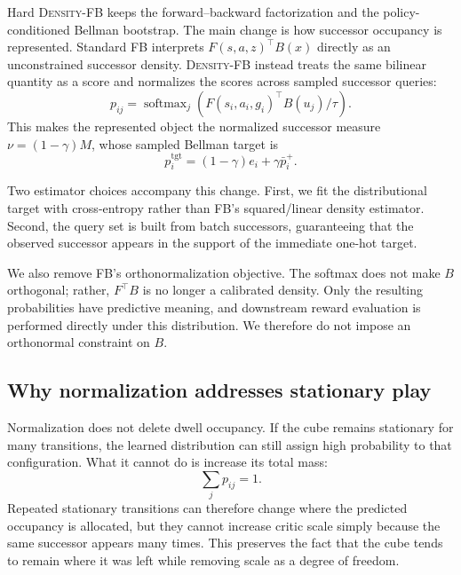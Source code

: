 \documentclass{article}
\newcommand{\DensityFB}{\textsc{Density-FB}}
\begin{document}
Hard \DensityFB{} keeps the forward--backward factorization and the policy-conditioned Bellman bootstrap.
The main change is how successor occupancy is represented.
Standard FB interprets $F(s,a,z)^\top B(x)$ directly as an unconstrained successor density.
\DensityFB{} instead treats the same bilinear quantity as a score and normalizes the scores across sampled successor queries:
\begin{equation}
    p_{ij} = \operatorname{softmax}_j \left( F(s_i,a_i,g_i)^\top B(u_j)/\tau \right).
\end{equation}
This makes the represented object the normalized successor measure $\nu=(1-\gamma)M$, whose sampled Bellman target is 
\begin{equation}
p_i^{\mathrm{tgt}} = (1-\gamma)e_i+\gamma\bar p_i^+.
\end{equation}

Two estimator choices accompany this change.
First, we fit the distributional target with cross-entropy rather than FB's squared/linear density estimator.
Second, the query set is built from batch successors, guaranteeing that the observed successor appears in the support of the immediate one-hot target.

We also remove FB's orthonormalization objective.
The softmax does not make $B$ orthogonal; rather, $F^\top B$ is no longer a calibrated density.
Only the resulting probabilities have predictive meaning, and downstream reward evaluation is performed directly under this distribution.
We therefore do not impose an orthonormal constraint on $B$.

\subsection{Why normalization addresses stationary play}

Normalization does not delete dwell occupancy.
If the cube remains stationary for many transitions, the learned distribution can still assign high probability to that configuration.
What it cannot do is increase its total mass:
\begin{equation}
    \sum_j p_{ij}=1.
\end{equation}
Repeated stationary transitions can therefore change where the predicted occupancy is allocated, but they cannot increase critic scale simply because the same successor appears many times.
This preserves the fact that the cube tends to remain where it was left while removing scale as a degree of freedom.
\end{document}
